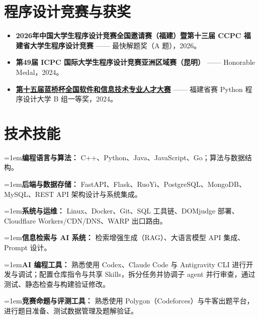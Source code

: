 \documentclass[10pt,a4paper]{article}
\newcommand{\skillrow}[2]{%
  \par\noindent\hangindent=1em\hangafter=1\textbf{#1} #2\par
}
\begin{document}
\section{程序设计竞赛与获奖}
\begin{itemize}
  \item \textbf{2026年中国大学生程序设计竞赛全国邀请赛（福建）暨第十三届 CCPC 福建省大学生程序设计竞赛} —— 最快解题奖（A 题），2026。
  \item \textbf{第49届 ICPC 国际大学生程序设计竞赛亚洲区域赛（昆明）} —— Honorable Medal，2024。
  \item \textbf{\href{https://www.lanqiao.cn/cup-fifteen/}{第十五届蓝桥杯全国软件和信息技术专业人才大赛}} —— 福建省赛 Python 程序设计大学 B 组一等奖，2024。
\end{itemize}

\section{技术技能}
\skillrow{编程语言与算法：}{C++、Python、Java、JavaScript、Go；算法与数据结构。}
\skillrow{后端与数据存储：}{FastAPI、Flask、RuoYi、PostgreSQL、MongoDB、MySQL、REST API 架构设计与系统集成。}
\skillrow{系统与运维：}{Linux、Docker、Git、SQL 工具链、DOMjudge 部署、Cloudflare Workers/CDN/DNS、WARP 出口路由。}
\skillrow{信息检索与 AI 系统：}{检索增强生成（RAG）、大语言模型 API 集成、Prompt 设计。}
\skillrow{AI 编程工具：}{熟悉使用 Codex、Claude Code 与 Antigravity CLI 进行开发与调试；配置仓库指令与共享 Skills，拆分任务并协调子 agent 并行审查，通过测试、静态检查与构建验证修改。}
\skillrow{竞赛命题与评测工具：}{熟悉使用 Polygon（Codeforces）与牛客出题平台，进行题目准备、测试数据管理及题解验证。}
\end{document}
